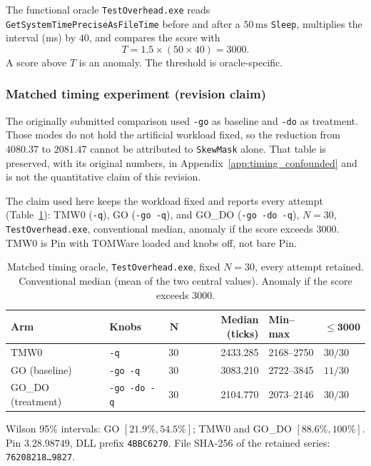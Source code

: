\documentclass[pdflatex,sn-mathphys-num]{sn-jnl}
\theoremstyle{thmstyleone}
\theoremstyle{thmstyletwo}
\theoremstyle{thmstylethree}
\begin{document}
The functional oracle \texttt{TestOverhead.exe} reads \texttt{GetSystemTimePreciseAsFileTime} before and after a $50\,\mathrm{ms}$ \texttt{Sleep}, multiplies the interval (ms) by $40$, and compares the score with
\begin{equation}
T = 1.5 \times (50 \times 40) = 3000.
\label{eq:threshold}
\end{equation}
A score above $T$ is an anomaly. The threshold is oracle-specific.

\subsubsection{Matched timing experiment (revision claim)}

The originally submitted comparison used \texttt{-go} as baseline and \texttt{-do} as treatment. Those modes do not hold the artificial workload fixed, so the reduction from $4080.37$ to $2081.47$ cannot be attributed to \texttt{SkewMask} alone. That table is preserved, with its original numbers, in Appendix~\ref{app:timing_confounded} and is not the quantitative claim of this revision.

The claim used here keeps the workload fixed and reports every attempt (Table~\ref{tab:timing_matched_n30}): TMW0 (\texttt{-q}), GO (\texttt{-go -q}), and GO\_DO (\texttt{-go -do -q}), $N=30$, \texttt{TestOverhead.exe}, conventional median, anomaly if the score exceeds $3000$. TMW0 is Pin with TOMWare loaded and knobs off, not bare Pin.

\begin{table}[t]
\caption{Matched timing oracle, \texttt{TestOverhead.exe}, fixed $N=30$, every attempt retained. Conventional median (mean of the two central values). Anomaly if the score exceeds $3000$.}
\label{tab:timing_matched_n30}
\centering
\small
\begin{tabular}{llrrll}
\toprule
\textbf{Arm} & \textbf{Knobs} & $\mathbf{N}$ & \textbf{Median (ticks)} & \textbf{Min--max} & $\boldsymbol{\le 3000}$ \\
\midrule
TMW0 & \texttt{-q} & 30 & 2433.285 & 2168--2750 & $30/30$ \\
GO (baseline) & \texttt{-go -q} & 30 & 3083.210 & 2722--3845 & $11/30$ \\
GO\_DO (treatment) & \texttt{-go -do -q} & 30 & 2104.770 & 2073--2146 & $30/30$ \\
\bottomrule
\end{tabular}
\vspace{3pt}
\parbox{\columnwidth}{\footnotesize Wilson 95\% intervals: GO $[21.9\%,54.5\%]$; TMW0 and GO\_DO $[88.6\%,100\%]$. Pin $3.28.98749$, DLL prefix \texttt{4BBC6270}. File SHA-256 of the retained series: \texttt{76208218\ldots9827}.}
\end{table}
\end{document}
